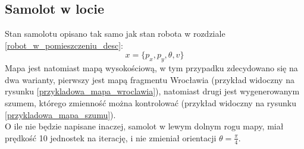 \subsection{Samolot w locie} \label{samolot_w_locie_chap}
Stan samolotu opisano tak samo jak stan robota w rozdziale \ref{robot_w_pomieszczeniu_desc}:
\begin{equation*}
	x = \{p_x,p_y,\theta,v\}
\end{equation*}
Mapa jest natomiast mapą wysokościową, w tym przypadku zdecydowano się na dwa warianty, pierwszy jest mapą fragmentu Wrocławia (przykład widoczny na rysunku \ref{przykladowa_mapa_wroclawia}), natomiast drugi jest wygenerowanym szumem, którego zmienność można kontrolować (przykład widoczny na rysunku \ref{przykladowa_mapa_szumu}).\\
O ile nie będzie napisane inaczej, samolot w lewym dolnym rogu mapy, miał prędkość 10 jednostek na iterację, i nie zmieniał orientacji $\theta=\frac{\pi}{4}$.
